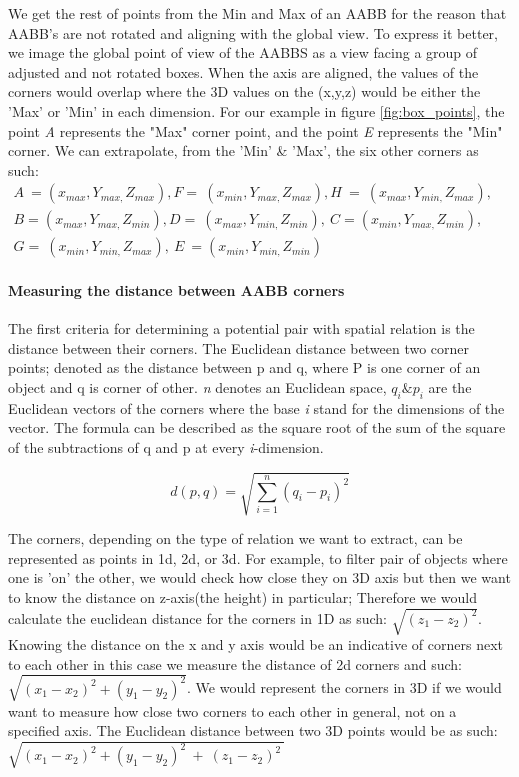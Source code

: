 We get the rest of points from the Min and Max of an AABB for the reason that AABB's are not rotated and aligning with the global view. To express it better, we image the global point of view of the AABBS as a view facing a group of adjusted and not rotated boxes. When the axis are aligned, the values of the corners would overlap where the 3D values on the (x,y,z) would be either the 'Max' or 'Min' in each dimension. For our example in figure \ref{fig:box_points}, the point \textit{A} represents the  "Max" corner point, and the point  \textit{E} represents the "Min" corner. We can extrapolate, from the 'Min' \& 'Max', the six other corners as such:   
$\begin{array}{l}
A\ =( x_{max} ,Y_{max,} Z_{max}) ,F=\ ( x_{min} ,Y_{max,} Z_{max}) ,H\ =\ ( x_{max} ,Y_{min,} Z_{max}) ,\\
B=( x_{max} ,Y_{max,} Z_{min}) ,D=\ ( x_{max} ,Y_{min,} Z_{min}) ,\ C=( x_{min} ,Y_{max,} Z_{min}) ,\\
G=\ ( x_{min} ,Y_{min,} Z_{max}) ,\ E\ =( x_{min} ,Y_{min,} Z_{min})
\end{array}$


\paragraph{Measuring the distance between AABB corners}

The first criteria for determining a potential pair with spatial relation is the distance between their corners. The Euclidean distance between two corner points; denoted as the distance between p and q, where P is one corner of an object and q is corner of other. \textit{n} denotes an Euclidean space,   $q_{i} \& p_{i}$ are the Euclidean vectors of the corners where the base \textit{i} stand for the dimensions of the vector. The formula can be described as the square root of the sum of the square of the subtractions of q and p at every \textit{i}-dimension. 

\[
 d\left( p,q\right)   = \sqrt {\sum _{i=1}^{n}  \left( q_{i}-p_{i}\right)^2}
\]

The corners, depending on the type of relation we want to extract, can be represented as points in  1d, 2d, or 3d. For example, to filter pair of objects where one is 'on' the other, we would check how close they on 3D axis but then we want to know the distance on z-axis(the height) in particular; Therefore we would calculate the euclidean distance for the corners in 1D as such: $ \sqrt{ (z_{1}-z_{2})^{2}}$. Knowing the distance on the x and y axis would be an indicative of corners next to each other in this case we measure the distance of 2d corners and such:$ \sqrt{ (x_{1}-x_{2})^{2}+(y_{1}-y_{2})^{2} }$. We would represent the corners in 3D if we would want to measure how close two corners to each other in general, not on a specified axis. The Euclidean distance between two 3D points would be as such: $ \sqrt{( x_{1} -x_{2})^{2} +( y_{1} -y_{2})^{2} \ +\ ( z_{1} -z_{2})^{2}\ } $

